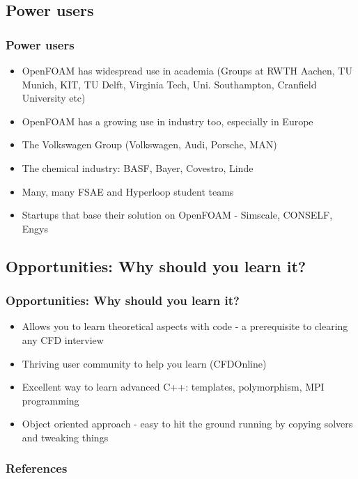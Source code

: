 \documentclass[notheorems, aspectratio=169]{beamer}
\begin{document}
\subsection{Power users}
\begin{frame}
\frametitle{Power users}
\begin{itemize}
  \item  OpenFOAM has widespread use in academia (Groups at RWTH Aachen, TU Munich, KIT, TU Delft, Virginia Tech, Uni. Southampton, Cranfield University etc)
  \item  OpenFOAM has a growing use in industry too, especially in Europe
  \item The Volkswagen Group (Volkswagen, Audi, Porsche, MAN) 
  \item The chemical industry: BASF,  Bayer, Covestro, Linde
  \item Many, many FSAE and Hyperloop student teams 
  \item Startups that base their solution on OpenFOAM - Simscale, CONSELF, Engys
\end{itemize}


\end{frame}


\subsection{Opportunities: Why should you learn it?}
\begin{frame}
\frametitle{Opportunities: Why should you learn it?}
\begin{itemize}
  \item Allows you to learn theoretical aspects with code - a prerequisite to clearing any CFD interview
  \item Thriving user community to help you learn (CFDOnline)
  \item Excellent way to learn advanced C++: templates, polymorphism, MPI programming
  \item Object oriented approach - easy to hit the ground running by copying solvers and tweaking things 
\end{itemize}
\end{frame}

 
\begin{frame}
  \frametitle{References}
  \nocite{jasak1996error}
  
\end{frame} 
\end{document}
